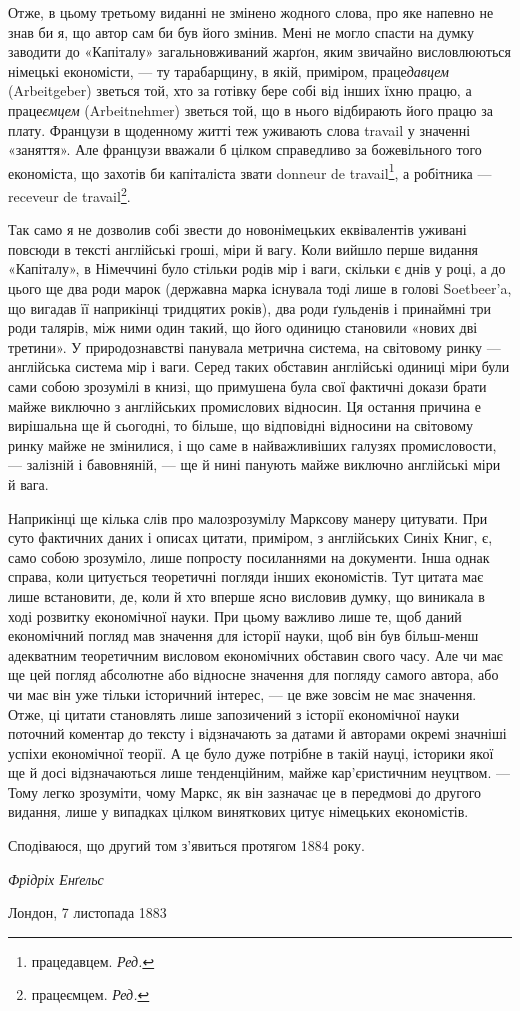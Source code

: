 Отже, в цьому третьому виданні не змінено жодного слова,
про яке напевно не знав би я, що автор сам би був його змінив.
Мені не могло спасти на думку заводити до «Капіталу» загальновживаний
жарґон, яким звичайно висловлюються німецькі економісти,
— ту тарабарщину, в якій, приміром, праце\emph{давцем} (Arbeitgeber)
зветься той, хто за готівку бере собі від інших їхню
працю, а праце\emph{ємцем} (Arbeitnehmer) зветься той, що в нього відбирають
його працю за плату. Французи в щоденному житті теж
уживають слова travail у значенні «заняття». Але французи
вважали б цілком справедливо за божевільного того економіста,
що захотів би капіталіста звати donneur de travail\footnote*{
працедавцем. \emph{Ред.}
}, а робітника —
receveur de travail\footnote*{ працеємцем. \emph{Ред.}}.

Так само я не дозволив собі звести до новонімецьких еквівалентів
уживані повсюди в тексті англійські гроші, міри й вагу. Коли
вийшло перше видання «Капіталу», в Німеччині було стільки
родів мір і ваги, скільки є днів у році, а до цього ще два роди
марок (державна марка існувала тоді лише в голові Soetbeer’a, що
вигадав її наприкінці тридцятих років), два роди ґульденів і
принаймні три роди талярів, між ними один такий, що його одиницю
становили «нових дві третини». У природознавстві панувала
метрична система, на світовому ринку — англійська система мір
і ваги. Серед таких обставин англійські одиниці міри були сами
собою зрозумілі в книзі, що примушена була свої фактичні докази
брати майже виключно з англійських промислових відносин. Ця
остання причина е вирішальна ще й сьогодні, то більше, що відповідні
відносини на світовому ринку майже не змінилися, і що саме
в найважливіших галузях промисловости, — залізній і бавовняній,
— ще й нині панують майже виключно англійські міри й вага.

Наприкінці ще кілька слів про малозрозумілу Марксову
манеру цитувати. При суто фактичних даних і описах цитати,
приміром, з англійських Синіх Книг, є, само собою зрозуміло,
лише попросту посиланнями на документи. Інша однак справа,
коли цитується теоретичні погляди інших економістів. Тут цитата
має лише встановити, де, коли й хто вперше ясно висловив
думку, що виникала в ході розвитку економічної науки. При
цьому важливо лише те, щоб даний економічний погляд мав
значення для історії науки, щоб він був більш-менш адекватним
теоретичним висловом економічних обставин свого часу. Але
чи має ще цей погляд абсолютне або відносне значення для погляду
самого автора, або чи має він уже тільки історичний
інтерес, — це вже зовсім не має значення. Отже, ці цитати становлять
лише запозичений з історії економічної науки поточний
коментар до тексту і відзначають за датами й авторами окремі
значніші успіхи економічної теорії. А це було дуже потрібне в
такій науці, історики якої ще й досі відзначаються лише тенденційним,
майже кар’єристичним неуцтвом. — Тому легко зрозуміти,
чому Маркс, як він зазначає це в передмові до другого видання,
лише у випадках цілком виняткових цитує німецьких економістів.

Сподіваюся, що другий том з’явиться протягом 1884 року.

\begin{flushright}
\emph{Фрідріх Енґельс}
\end{flushright}

{\small Лондон, 7 листопада 1883~}
